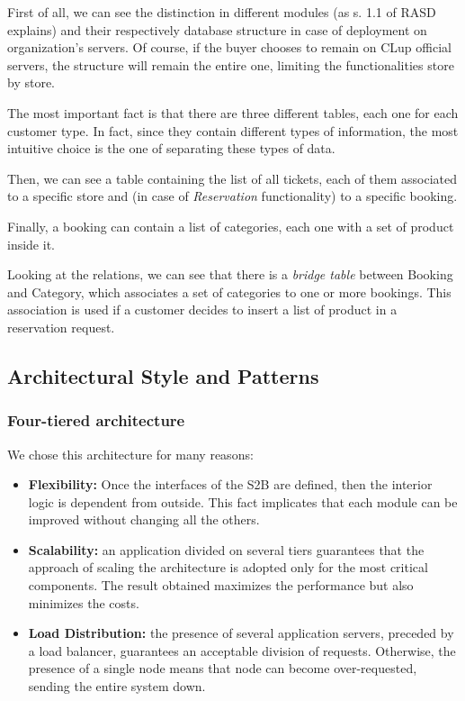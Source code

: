 \documentclass[table, 12pt]{article}
\begin{document}
First of all, we can see the distinction in different modules (as s. 1.1 of RASD explains) and their respectively database structure in case of deployment on organization's servers. Of course, if the buyer chooses to remain on CLup official servers, the structure will remain the entire one, limiting the functionalities store by store.

The most important fact is that there are three different tables, each one for each customer type. In fact, since they contain different types of information, the most intuitive choice is the one of separating these types of data.

Then, we can see a table containing the list of all tickets, each of them associated to a specific store and (in case of \textit{Reservation} functionality) to a specific booking.

Finally, a booking can contain a list of categories, each one with a set of product inside it.

Looking at the relations, we can see that there is a \textit{bridge table} between Booking and Category, which associates a set of categories to one or more bookings. This association is used if a customer decides to insert a list of product in a reservation request.

\subsection{Architectural Style and Patterns}
\subsubsection{Four-tiered architecture}
We chose this architecture for many reasons:
\begin{itemize}
    \item \textbf{Flexibility:} Once the interfaces of the S2B are defined, then the interior logic is dependent from outside. This fact implicates that each module can be improved without changing all the others.
    \item \textbf{Scalability:} an application divided on several tiers guarantees that the approach of scaling the architecture is adopted only for the most critical components. The result obtained maximizes the performance but also minimizes the costs.
    \item \textbf{Load Distribution:} the presence of several application servers, preceded by a load balancer, guarantees an acceptable division of requests. Otherwise, the presence of a single node means that node can become over-requested, sending the entire system down.
\end{itemize}
\end{document}
